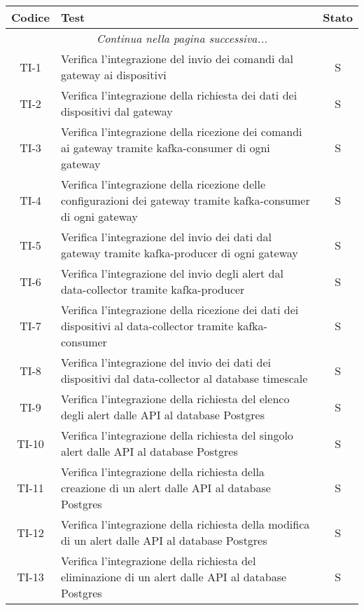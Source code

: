 		\begin{center}
			\begin{longtable}{|c|p{12cm}|c|}
			\hline
			\rowcolor{lighter-grayer}
			\textbf{Codice} & \textbf{Test} & \textbf{Stato}  \\ %
			\hline
			\endhead
			\hline
	        \multicolumn{3}{|c|}{\textit{Continua nella pagina successiva...}}\\
	        \hline
	        \endfoot
	        \endlastfoot

			\hline
			TI-1 & Verifica l'integrazione del invio dei comandi dal gateway ai dispositivi & S \\
			\hline
			TI-2 & Verifica l'integrazione della richiesta dei dati dei dispositivi dal gateway & S \\
			\hline
			TI-3 & Verifica l'integrazione della ricezione dei comandi ai gateway tramite kafka-consumer di ogni gateway & S \\
			\hline
			TI-4 & Verifica l'integrazione della ricezione delle configurazioni dei gateway tramite kafka-consumer di ogni gateway & S \\
			\hline
			TI-5 & Verifica l'integrazione del invio dei dati dal gateway tramite kafka-producer di ogni gateway & S \\
			\hline
			TI-6 & Verifica l'integrazione del invio degli alert dal data-collector tramite kafka-producer & S \\
			\hline
			TI-7 & Verifica l'integrazione della ricezione dei dati dei dispositivi al data-collector tramite kafka-consumer & S \\
			\hline
			TI-8 & Verifica l'integrazione del invio dei dati dei dispositivi dal data-collector al database timescale & S \\
			\hline
			TI-9 & Verifica l'integrazione della richiesta del elenco degli alert dalle API al database Postgres & S \\
			\hline
			TI-10 & Verifica l'integrazione della richiesta del singolo alert dalle API al database Postgres & S \\
			\hline
			TI-11 & Verifica l'integrazione della richiesta della creazione di un alert dalle API al database Postgres & S \\
			\hline
			TI-12 & Verifica l'integrazione della richiesta della modifica di un alert dalle API al database Postgres & S \\
			\hline
			TI-13 & Verifica l'integrazione della richiesta del eliminazione di un alert dalle API al database Postgres & S \\

\end{longtable}
\end{center}

